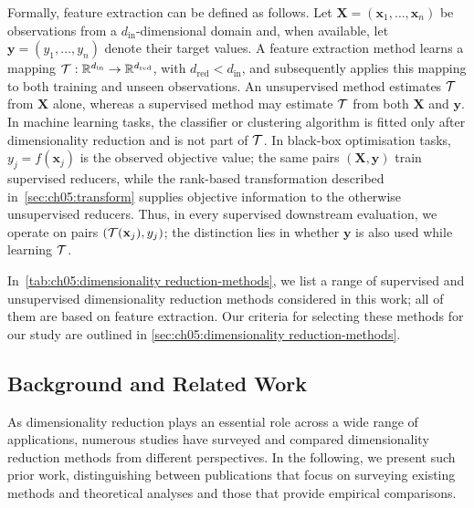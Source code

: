 Formally, feature extraction can be defined as follows.
Let $\mathbf X=(\mathbf{x}_1,\ldots,\mathbf{x}_n)$ be observations from a $d_{\mathrm{in}}$-dimensional domain and, when available, let $\mathbf y=(y_1,\ldots,y_n)$ denote their target values. A feature extraction method learns a mapping $\mathcal{T}:\mathbb{R}^{d_{\mathrm{in}}}\rightarrow\mathbb{R}^{d_{\mathrm{red}}}$, with $d_{\mathrm{red}}<d_{\mathrm{in}}$, and subsequently applies this mapping to both training and unseen observations. An unsupervised method estimates $\mathcal{T}$ from $\mathbf X$ alone, whereas a supervised method may estimate $\mathcal{T}$ from both $\mathbf X$ and $\mathbf y$. In machine learning tasks, the classifier or clustering algorithm is fitted only after dimensionality reduction and is not part of $\mathcal{T}$. In black-box optimisation tasks, $y_j=f(\mathbf{x}_j)$ is the observed objective value; the same pairs $(\mathbf X,\mathbf y)$ train supervised reducers, while the rank-based transformation described in~\cref{sec:ch05:transform} supplies objective information to the otherwise unsupervised reducers. Thus, in every supervised downstream evaluation, we operate on pairs $(\mathcal{T}(\mathbf{x}_j),y_j)$; the distinction lies in whether $\mathbf y$ is also used while learning $\mathcal{T}$.

In~\cref{tab:ch05:dimensionality reduction-methods}, we list a range of supervised and unsupervised dimensionality reduction methods considered in this work; all of them are based on feature extraction.
Our criteria for selecting these methods for our study are outlined in \cref{sec:ch05:dimensionality reduction-methods}.

\subsection{Background and Related Work}
\label{sec:ch05:rel-work}

As dimensionality reduction plays an essential role across a wide range of applications, numerous studies have surveyed and compared dimensionality reduction methods from different perspectives. In the following, we present such prior work, distinguishing between publications
that focus on surveying existing methods and theoretical analyses and those that provide empirical comparisons.

